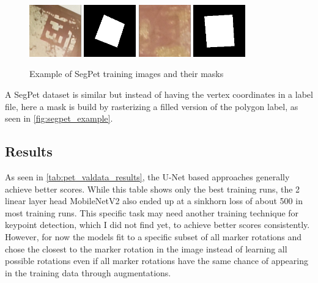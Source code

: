 \documentclass[10pt]{book}
\begin{document}
\begin{figure}
  \centering
     {\includegraphics[width=0.2\textwidth]{image/segpet_example_in}}
     {\includegraphics[width=0.2\textwidth]{image/segpet_example_seg}}
     {\includegraphics[width=0.2\textwidth]{image/segpet_example_2_in}}
     {\includegraphics[width=0.2\textwidth]{image/segpet_example_2_seg}}
  \caption{Example of SegPet training images and their masks}
  \label{fig:segpet_example}
\end{figure}

A SegPet dataset is similar but instead of having the vertex coordinates in a label file, here a mask is build by rasterizing a filled version of the polygon label, as seen in \autoref{fig:segpet_example}.

\subsection{Results}

As seen in \autoref{tab:pet_valdata_results}, the U-Net based approaches generally achieve better scores. While this table shows only the best training runs, the 2 linear layer head MobileNetV2 also ended up at a sinkhorn loss of about 500 in most training runs. This specific task may need another training technique for keypoint detection, which I did not find yet, to achieve better scores consistently. However, for now the models fit to a specific subset of all marker rotations and chose the closest to the marker rotation in the image instead of learning all possible rotations even if all marker rotations have the same chance of appearing in the training data through augmentations. 
\end{document}
